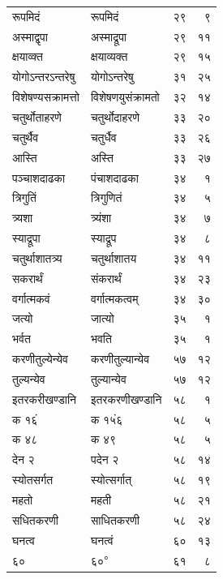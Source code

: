 \documentclass[11pt, openany]{book}
\begin{document}
{\begin{longtable}{llrr}
रूपमिदं &रूपमिदं &२९& ९\\
अस्माद्वृपा &अस्माद्रूपा& २९& ११\\
क्षयाव्क्त& क्षयाव्यक्त &२९& १५\\
योगोऽन्तरऽन्तरेषु &योगोऽन्तरेषु &३१& २५\\
विशेषण्यसक्रामत्तो &विशेषणयुसंक्रामतो &३२& १४\\
चतुर्थोताहरणे &चतुर्थोदाहरणे &३३& २०\\
चतुर्थैव &चतुर्धैव &३३& २६\\
आस्ति &अस्ति &३३ &२७\\
पञ्चाशदाढका& पंचाशदाढका& ३४ &१\\
त्रिगुतिं &त्रिगुणितं &३४& ५\\
त्र्यशा &त्र्यंशा &३४& ७\\
स्याद्रूपा &स्याद्रूप &३४& ८\\
चतुर्थाशातत्र्य& चतुर्थाशातय &३४& ११\\
सकरार्थं &संकरार्थं &३४& २३\\
वर्गात्मकवं& वर्गात्मकत्वम् &३४& ३०\\
जत्यो &जात्यो &३५& १\\
भर्वत &भवति &३५& १\\
करणीतुल्येन्येव &करणीतुल्यान्येव &५७& १२\\
तुल्यन्येव& तुल्यान्येव &५७& १२\\
इतरकरीखण्डानि& इतरकरणीखण्डानि &५८& १\\
क १६ं& क १५ं६ &५८& ५\\
क ४८ &क ४९& ५८& ५\\
देन २& पदेन २& ५८& १४\\
स्योतसर्गत &स्योत्सर्गात्& ५८& १९\\
महतो& महती &५८& २१\\
सधितकरणी &साधितकरणी &५८& २४\\
घनत्व& घनत्वं &६०& १३\\
६०& ६०$^{\text{०}}$& ६१& ८\\



\end{longtable}}
\end{document}
